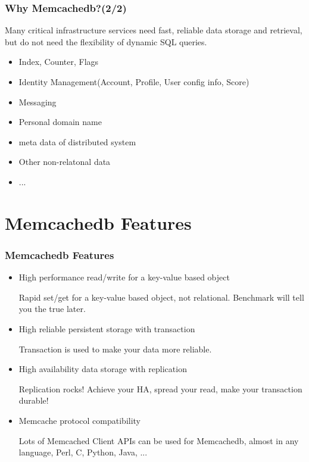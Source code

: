 \documentclass{beamer}
\newcommand{\mysection}[1]{\section{#1}\frame{\frametitle{#1}\tableofcontents[sectionstyle=show/shaded,subsectionstyle=show/shaded/shaded]}}
\begin{document}
\begin{frame}
\frametitle{Why Memcachedb?(2/2)}

Many critical infrastructure services need fast, reliable data storage and retrieval,
but do not need the flexibility of dynamic SQL queries.
\begin{itemize}
\item Index, Counter, Flags
\item Identity Management(Account, Profile, User config info, Score)
\item Messaging
\item Personal domain name
\item meta data of distributed system
\item Other non-relatonal data
\item ...
\end{itemize}
\end{frame}

\mysection{Memcachedb Features}
\begin{frame}
\frametitle{Memcachedb Features}
\begin{itemize}
\item High performance read/write for a key-value based object

Rapid set/get for a key-value based object, not relational.
Benchmark will tell you the true later.

\item High reliable persistent storage with transaction

Transaction is used to make your data more reliable.

\item High availability data storage with replication

Replication rocks! Achieve your HA, spread your read, make your
transaction durable!

\item Memcache protocol compatibility

Lots of Memcached Client APIs can be used for Memcachedb, almost in any
language, Perl, C, Python, Java, ...

\end{itemize}
\end{frame}
\end{document}
